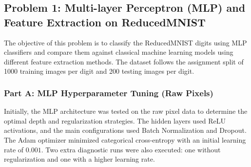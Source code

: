 \subsection{Problem 1: Multi-layer Perceptron (MLP) and Feature Extraction on ReducedMNIST}

The objective of this problem is to classify the ReducedMNIST digits using MLP classifiers and compare them against classical machine learning models using different feature extraction methods. The dataset follows the assignment split of 1000 training images per digit and 200 testing images per digit.

\subsubsection{Part A: MLP Hyperparameter Tuning (Raw Pixels)}
Initially, the MLP architecture was tested on the raw pixel data to determine the optimal depth and regularization strategies. The hidden layers used ReLU activations, and the main configurations used Batch Normalization and Dropout. The Adam optimizer minimized categorical cross-entropy with an initial learning rate of $0.001$. Two extra diagnostic runs were also executed: one without regularization and one with a higher learning rate.

\begin{table}[H]
    \centering
    \caption{MLP Hyperparameter Tuning Results (Raw Pixels)}
    \label{tab:prob1_mlp_tuning}
\end{table}

